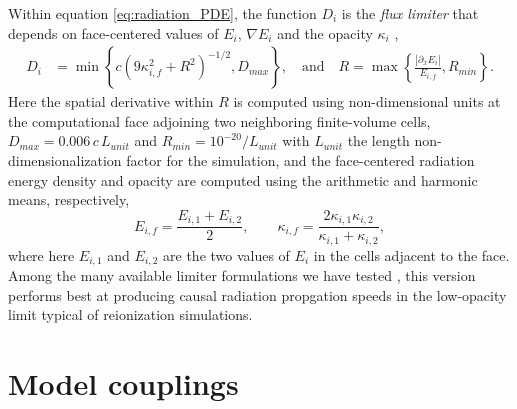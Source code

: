 \documentclass[letterpaper,10pt]{article}
\renewcommand{\(}{\left(}
\renewcommand{\)}{\right)}
\begin{document}
Within equation \eqref{eq:radiation_PDE}, the function
$D_i$ is the {\em flux limiter} that depends on face-centered values of
$E_i$, $\nabla E_i$ and the opacity $\kappa_i$ \cite{Morel2000},
\begin{align}
  D_i &= \min\left\{c \(9\kappa_{i,f}^2 + R^2\)^{-1/2}, D_{max}\right\},\quad\mbox{and}\quad
  R = \max\left\{\frac{|\partial_{x} E_i|}{E_{i,f}},R_{min}\right\}.
\end{align}
Here the spatial derivative within $R$ is computed using
non-dimensional units at the computational face adjoining two
neighboring finite-volume cells, $D_{max}=0.006\,c\,L_{unit}$ and
$R_{min}=10^{-20}/L_{unit}$ with $L_{unit}$ the length
non-dimensionalization factor for the simulation, and the 
face-centered radiation energy density and opacity are computed using
the arithmetic and harmonic means, respectively,
\[
   E_{i,f} = \frac{E_{i,1} + E_{i,2}}{2}, \qquad
   \kappa_{i,f} = \frac{2\kappa_{i,1} \kappa_{i,2}}{\kappa_{i,1} + \kappa_{i,2}},
\]
where here $E_{i,1}$ and $E_{i,2}$ are the two values of $E_i$ in the
cells adjacent to the face.  Among the many available limiter
formulations we have tested
\cite{HayesNorman2003,Morel2000,ReynoldsHayesPaschosNorman2009}, this  
version performs best at producing causal radiation propgation
speeds in the low-opacity limit typical of reionization simulations.  




\section{Model couplings}
\label{sec:chem_model}
\end{document}

